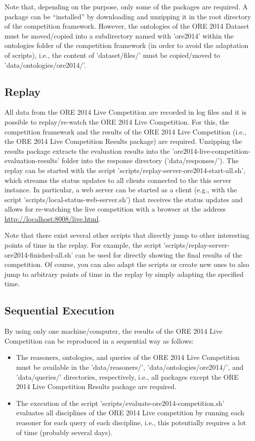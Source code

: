 \documentclass{article}
\begin{document}
Note that, depending on the purpose, only some of the packages are required. 
A package can be ``installed'' by downloading and unzipping it in the root directory of the competition framework.
However, the ontologies of the ORE 2014 Dataset must be moved/copied into a subdirectory named with 'ore2014' within the ontologies folder of the competition framework (in order to avoid the adaptation of scripts), i.e., the content of 'dataset/files/' must be copied/moved to 'data/ontologies/ore2014/'.



\subsection{Replay}

All data from the ORE 2014 Live Competition are recorded in log files and it is possible to replay/re-watch the ORE 2014 Live Competition. 
For this, the competition framework and the results of the ORE 2014 Live Competition (i.e., the ORE 2014 Live Competition Results package) are required. 
Unzipping the results package extracts the evaluation results into the 'ore2014-live-competition-evaluation-results' folder into the response directory ('data/responses/').
The replay can be started with the script 'scripts/replay-server-ore2014-start-all.sh', which streams the status updates to all clients connected to the this server instance. 
In particular, a web server can be started as a client (e.g., with the script 'scripts/local-status-web-server.sh') that receives the status updates and allows for re-watching the live competition with a browser at the address \url{http://localhost:8008/live.html}.

Note that there exist several other scripts that directly jump to other interesting points of time in the replay. For example, the script 'scripts/replay-server-ore2014-finished-all.sh' can be used for directly showing the final results of the competition.
Of course, you can also adapt the scripts or create new ones to also jump to arbitrary points of time in the replay by simply adapting the specified time.


\subsection{Sequential Execution}

By using only one machine/computer, the results of the ORE 2014 Live Competition can be reproduced in a sequential way as follows:
\begin{itemize}
\item The reasoners, ontologies, and queries of the ORE 2014 Live Competition must be available in the 'data/reasoners/', 'data/ontologies/ore2014/', and 'data/queries/' directories, respectively, i.e., all packages except the ORE 2014 Live Competition Results package are required.
\item The execution of the script 'scripts/evaluate-ore2014-competition.sh' evaluates all disciplines of the ORE 2014 Live competition by running each reasoner for each query of each discipline, i.e., this potentially requires a lot of time (probably several days).

\end{itemize}
\end{document}
